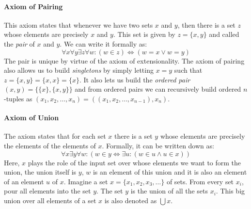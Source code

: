 

\paragraph{Axiom of Pairing}
This axiom states that whenever we have two sets $x$ and $y$, then there is a set $z$ whose elements are precisely $x$ and $y$. This set is given by $z = \{x, y\}$ and called the \emph{pair} of $x$ and $y$. We can write it formally as:
\begin{equation}
\forall x \forall y \exists z \forall w: (w \in z) \Leftrightarrow (w = x \vee w = y)
\end{equation}
The pair is unique by virtue of the axiom of extensionality. The axiom of pairing also allows us to build \emph{singletons} by simply letting $x = y$ such that  $z = \{x, y\} = \{x, x\} = \{x\}$. It also lets us build the \emph{ordered pair} $(x,y) = \{ \{x\}, \{x, y\} \}$ and from ordered pairs we can recursively build ordered $n$-tuples as $(x_1, x_2, \ldots, x_n) = ((x_1, x_2, \ldots, x_{n-1}), x_n)$. 




\paragraph{Axiom of Union}
The axiom states that for each set $x$ there is a set $y$ whose elements are precisely the elements of the elements of $x$. Formally, it can be written down as:
\begin{equation}
\forall x \exists y \forall w:
(w \in y \Leftrightarrow \exists u:(w \in u \wedge u \in x )  )
\end{equation}
Here, $x$ plays the role of the input set over whose elements we want to form the union, the union itself is $y$, $w$ is an element of this union and it is also an element of an element $u$ of $x$. Imagine a set $x = \{ x_1, x_2, x_3, \ldots \} $ of sets. From every set $x_i$, pour all elements into the set $y$. The set $y$ is the union of all the sets $x_i$. This big union over all elements of a set $x$ is also denoted as $\bigcup x$.

